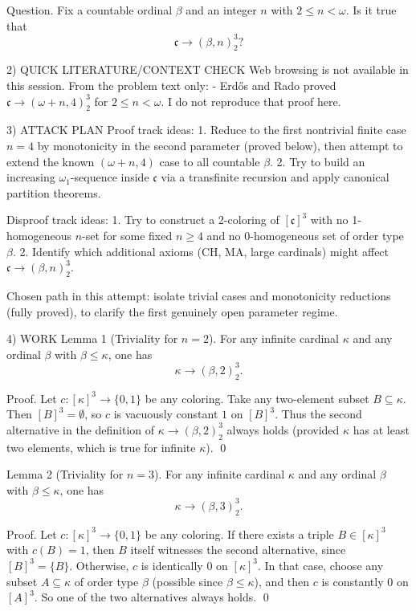 Question.
Fix a countable ordinal $\beta$ and an integer $n$ with $2\le n<\omega$. Is it true that
\[\mathfrak c \to (\beta,n)^3_2?\]

2) QUICK LITERATURE/CONTEXT CHECK
Web browsing is not available in this session.
From the problem text only:
- Erd\H{o}s and Rado proved $\mathfrak c\to(\omega+n,4)^3_2$ for $2\le n<\omega$.
I do not reproduce that proof here.

3) ATTACK PLAN
Proof track ideas:
1. Reduce to the first nontrivial finite case $n=4$ by monotonicity in the second parameter (proved below), then attempt to extend the known $(\omega+n,4)$ case to all countable $\beta$.
2. Try to build an increasing $\omega_1$-sequence inside $\mathfrak c$ via a transfinite recursion and apply canonical partition theorems.

Disproof track ideas:
1. Try to construct a 2-coloring of $[\mathfrak c]^3$ with no 1-homogeneous $n$-set for some fixed $n\ge 4$ and no 0-homogeneous set of order type $\beta$.
2. Identify which additional axioms (CH, MA, large cardinals) might affect $\mathfrak c\to(\beta,n)^3_2$.

Chosen path in this attempt: isolate trivial cases and monotonicity reductions (fully proved), to clarify the first genuinely open parameter regime.

4) WORK
Lemma 1 (Triviality for $n=2$).
For any infinite cardinal $\kappa$ and any ordinal $\beta$ with $\beta\le \kappa$, one has
\[\kappa\to(\beta,2)^3_2.\]

Proof.
Let $c:[\kappa]^3\to\{0,1\}$ be any coloring. Take any two-element subset $B\subseteq\kappa$.
Then $[B]^3=\emptyset$, so $c$ is vacuously constant $1$ on $[B]^3$.
Thus the second alternative in the definition of $\kappa\to(\beta,2)^3_2$ always holds (provided $\kappa$ has at least two elements, which is true for infinite $\kappa$). \qed

Lemma 2 (Triviality for $n=3$).
For any infinite cardinal $\kappa$ and any ordinal $\beta$ with $\beta\le \kappa$, one has
\[\kappa\to(\beta,3)^3_2.\]

Proof.
Let $c:[\kappa]^3\to\{0,1\}$ be any coloring.
If there exists a triple $B\in[\kappa]^3$ with $c(B)=1$, then $B$ itself witnesses the second alternative, since $[B]^3=\{B\}$.
Otherwise, $c$ is identically $0$ on $[\kappa]^3$. In that case, choose any subset $A\subseteq \kappa$ of order type $\beta$ (possible since $\beta\le\kappa$),
and then $c$ is constantly $0$ on $[A]^3$. So one of the two alternatives always holds. \qed

